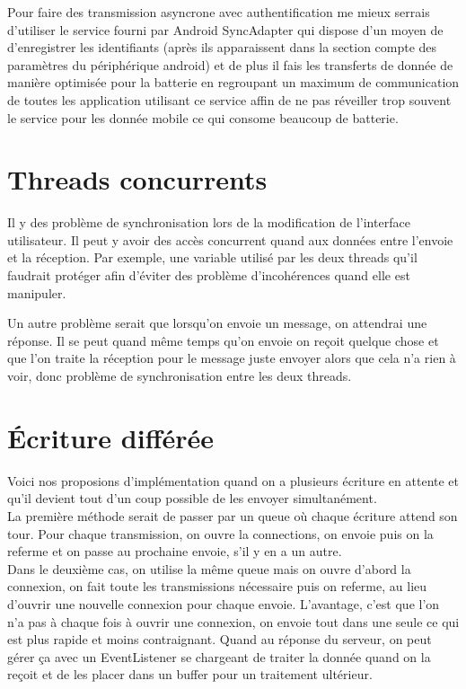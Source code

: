 \documentclass[10pt,a4paper]{article}
\begin{document}
Pour faire des transmission asyncrone avec authentification me mieux serrais d'utiliser le service fourni par Android SyncAdapter qui dispose d'un moyen de d'enregistrer les identifiants (après ils apparaissent dans la section compte des paramètres du périphérique android) et de plus il fais les transferts de donnée de manière optimisée pour la batterie en regroupant un maximum de communication de toutes les application utilisant ce service affin de ne pas réveiller trop souvent le service pour les donnée mobile ce qui consome beaucoup de batterie.
\section{Threads concurrents}
Il y des problème de synchronisation lors de la modification de l'interface utilisateur. 
Il peut y avoir des accès concurrent quand aux données entre l'envoie et la réception.
Par exemple, une variable utilisé par les deux threads qu'il faudrait protéger afin d'éviter des problème d'incohérences quand elle est manipuler.

Un autre problème serait que lorsqu'on envoie un message, on attendrai une réponse. 
Il se peut quand même temps qu'on envoie on reçoit quelque chose et que l'on traite la réception pour le message juste envoyer alors que cela n'a rien à voir, donc problème de synchronisation entre les deux threads.

\section{Écriture différée}

Voici nos proposions d'implémentation quand on a plusieurs écriture en attente et qu'il devient tout d'un coup possible de les envoyer simultanément. \\

La première méthode serait de passer par un queue où chaque écriture attend son tour.
Pour chaque transmission, on ouvre la connections, on envoie puis on la referme et on passe au prochaine envoie, s'il y en a un autre.\\

Dans le deuxième cas, on utilise la même queue mais on ouvre d'abord la connexion, on fait toute les transmissions nécessaire puis on referme, au lieu d'ouvrir une nouvelle connexion pour chaque envoie. L'avantage, c'est que l'on n'a pas à chaque fois à ouvrir une connexion, on envoie tout dans une seule ce qui est plus rapide et moins contraignant. Quand au réponse du serveur, on peut gérer ça avec un EventListener se chargeant de traiter la donnée quand on la reçoit et de les placer dans un buffer pour un traitement ultérieur.\\
\end{document}
